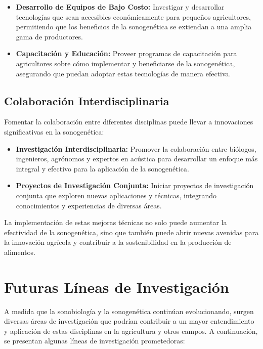 \documentclass[twocolumn]{article}
\begin{document}
\begin{itemize}
    \item \textbf{Desarrollo de Equipos de Bajo Costo:} Investigar y desarrollar tecnologías que sean accesibles económicamente para pequeños agricultores, permitiendo que los beneficios de la sonogenética se extiendan a una amplia gama de productores.

    \item \textbf{Capacitación y Educación:} Proveer programas de capacitación para agricultores sobre cómo implementar y beneficiarse de la sonogenética, asegurando que puedan adoptar estas tecnologías de manera efectiva.
\end{itemize}

\subsection{Colaboración Interdisciplinaria}

Fomentar la colaboración entre diferentes disciplinas puede llevar a innovaciones significativas en la sonogenética:

\begin{itemize}
    \item \textbf{Investigación Interdisciplinaria:} Promover la colaboración entre biólogos, ingenieros, agrónomos y expertos en acústica para desarrollar un enfoque más integral y efectivo para la aplicación de la sonogenética.

    \item \textbf{Proyectos de Investigación Conjunta:} Iniciar proyectos de investigación conjunta que exploren nuevas aplicaciones y técnicas, integrando conocimientos y experiencias de diversas áreas.
\end{itemize}

La implementación de estas mejoras técnicas no solo puede aumentar la efectividad de la sonogenética, sino que también puede abrir nuevas avenidas para la innovación agrícola y contribuir a la sostenibilidad en la producción de alimentos.

\section{Futuras Líneas de Investigación}

A medida que la sonobiología y la sonogenética continúan evolucionando, surgen diversas áreas de investigación que podrían contribuir a un mayor entendimiento y aplicación de estas disciplinas en la agricultura y otros campos. A continuación, se presentan algunas líneas de investigación prometedoras:
\end{document}
